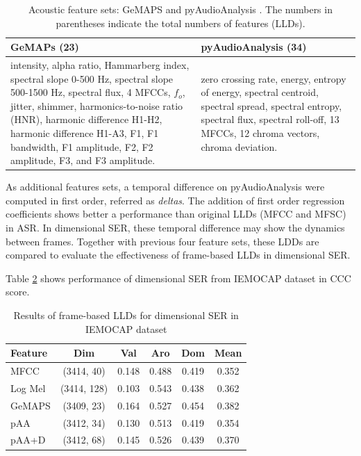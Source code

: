 \begin{table}[htpb]
\caption{Acoustic feature sets: GeMAPS \cite{Eyben} and pyAudioAnalysis
\cite{Giannakopoulos2015}. The numbers in parentheses indicate the total
numbers of features (LLDs).}
\label{tab:gemaps_paa}
  \begin{center}
  \begin{tabular}{p{7.5cm} | p{7cm}}
  \hline 
  \hspace{2.5cm}GeMAPs (23) & \hspace{1.5cm}pyAudioAnalysis (34) \\
  \hline \hline
intensity, alpha ratio, Hammarberg index, spectral slope 0-500 Hz, spectral
slope 500-1500 Hz, spectral flux, 4 MFCCs, $f_o$, jitter, shimmer,
harmonics-to-noise ratio (HNR), harmonic difference H1-H2, harmonic difference
H1-A3, F1, F1 bandwidth, F1 amplitude, F2, F2 amplitude, F3, and F3 amplitude.
& zero crossing rate, energy, entropy of energy, spectral centroid, spectral
spread, spectral entropy, spectral flux, spectral roll-off, 13 MFCCs, 12 chroma
vectors, chroma deviation.\\
  \hline 
  \end{tabular}
\end{center}
 \end{table}

As additional features sets, a temporal difference on pyAudioAnalysis were
computed in first order, referred as \emph{deltas}. The addition of first order
regression coefficients shows better a performance than original LLDs (MFCC and
MFSC) in ASR. In dimensional SER, these temporal difference may show the
dynamics between frames. Together with previous four feature sets, these LDDs
are compared to evaluate the effectiveness of frame-based LLDs in dimensional
SER. 

Table \ref{tab:iemocap-lld} shows performance of dimensional SER from IEMOCAP
dataset in CCC score. 

\begin{table}
    \caption{Results of frame-based LLDs for dimensional SER in IEMOCAP dataset}
    \begin{center}
    \begin{tabular}{l | c | c c c c}
      \hline 
      Feature & Dim & Val & Aro & Dom & Mean \\
      \hline \hline
      MFCC	    & (3414, 40)	  &0.148	  & 0.488	  & 0.419	  & 0.352 \\
      Log Mel	  & (3414, 128)   &0.103    & 0.543   & 0.438   & 0.362 \\
      GeMAPS	  & (3409, 23)	  &0.164	  & 0.527	  & 0.454	  & 0.382 \\
      pAA	      & (3412, 34)	  &0.130	  & 0.513	  & 0.419	  & 0.354 \\
      pAA+D	    & (3412, 68)	  &0.145	  & 0.526	  & 0.439	  & 0.370 \\
      \hline
    \end{tabular}
    \label{tab:iemocap-lld}
  \end{center}
\end{table}




